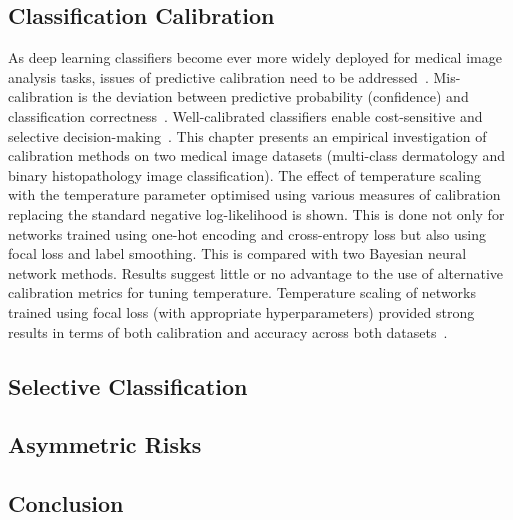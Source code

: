 \subsection*{Classification Calibration}
As deep learning classifiers become ever more widely deployed for medical image analysis tasks, issues of predictive calibration need to be addressed~\citep{maron2019systematic}. Mis-calibration is the deviation between predictive probability (confidence) and classification correctness~\citep{guo2017calibration}. Well-calibrated classifiers enable cost-sensitive and selective decision-making~\citep{carse2021robust}. This chapter presents an empirical investigation of calibration methods on two medical image datasets (multi-class dermatology and binary histopathology image classification). The effect of temperature scaling with the temperature parameter optimised using various measures of calibration replacing the standard negative log-likelihood is shown. This is done not only for networks trained using one-hot encoding and cross-entropy loss but also using focal loss and label smoothing. This is compared with two Bayesian neural network methods. Results suggest little or no advantage to the use of alternative calibration metrics for tuning temperature. Temperature scaling of networks trained using focal loss (with appropriate hyperparameters) provided strong results in terms of both calibration and accuracy across both datasets~\citep{carse2022calibration}.

\subsection*{Selective Classification}

\subsection*{Asymmetric Risks}

\subsection*{Conclusion}
